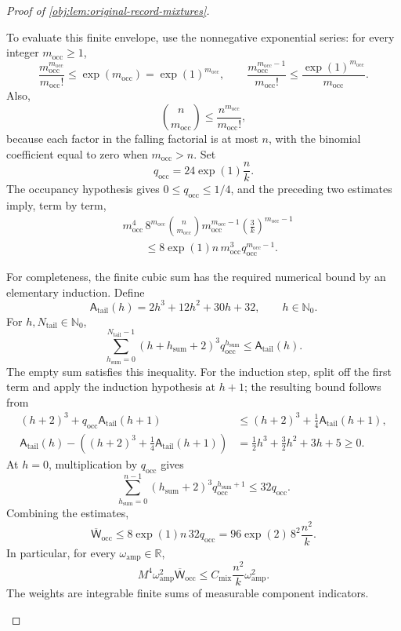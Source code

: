 \begin{proof}[Proof of \cref{obj:lem:original-record-mixtures}]
\begin{enumerate}
To evaluate this finite envelope, use the nonnegative exponential series:
for every integer \(m_{\mathrm{occ}}\ge1\),
\[
\frac{m_{\mathrm{occ}}^{m_{\mathrm{occ}}}}{m_{\mathrm{occ}}!}
\le \exp(m_{\mathrm{occ}})
=\exp(1)^{m_{\mathrm{occ}}},
\qquad
\frac{m_{\mathrm{occ}}^{m_{\mathrm{occ}}-1}}
{m_{\mathrm{occ}}!}
\le\frac{\exp(1)^{m_{\mathrm{occ}}}}{m_{\mathrm{occ}}}.
\]
Also,
\[
\binom n{m_{\mathrm{occ}}}
\le\frac{n^{m_{\mathrm{occ}}}}{m_{\mathrm{occ}}!},
\]
because each factor in the falling factorial is at most \(n\), with
the binomial coefficient equal to zero when \(m_{\mathrm{occ}}>n\).
Set
\[
q_{\mathrm{occ}}=24\exp(1)\frac nk.
\]
The occupancy hypothesis gives \(0\le q_{\mathrm{occ}}\le1/4\), and the
preceding two estimates imply, term by term,
\[
\begin{aligned}
&m_{\mathrm{occ}}^4\,8^{m_{\mathrm{occ}}}
\binom n{m_{\mathrm{occ}}}
m_{\mathrm{occ}}^{m_{\mathrm{occ}}-1}
\left(\frac3k\right)^{m_{\mathrm{occ}}-1}\\
&\hspace{2em}\le
8\exp(1)n\,m_{\mathrm{occ}}^3
q_{\mathrm{occ}}^{m_{\mathrm{occ}}-1}.
\end{aligned}
\]

For completeness, the finite cubic sum has the required numerical bound
by an elementary induction. Define
\[
\mathsf A_{\mathrm{tail}}(h)
=2h^3+12h^2+30h+32,
\qquad h\in\mathbb N_0.
\]
For \(h,N_{\mathrm{tail}}\in\mathbb N_0\),
\[
\sum_{h_{\mathrm{sum}}=0}^{N_{\mathrm{tail}}-1}
(h+h_{\mathrm{sum}}+2)^3q_{\mathrm{occ}}^{h_{\mathrm{sum}}}
\le \mathsf A_{\mathrm{tail}}(h).
\]
The empty sum satisfies this inequality. For the induction step, split
off the first term and apply the induction hypothesis at \(h+1\);
the resulting bound follows from
\[
\begin{aligned}
(h+2)^3+q_{\mathrm{occ}}\mathsf A_{\mathrm{tail}}(h+1)
&\le (h+2)^3+\frac14\mathsf A_{\mathrm{tail}}(h+1),\\
\mathsf A_{\mathrm{tail}}(h)
-\left((h+2)^3+\frac14\mathsf A_{\mathrm{tail}}(h+1)\right)
&=\frac12h^3+\frac32h^2+3h+5\ge0.
\end{aligned}
\]
At \(h=0\), multiplication by \(q_{\mathrm{occ}}\) gives
\[
\sum_{h_{\mathrm{sum}}=0}^{n-1}
(h_{\mathrm{sum}}+2)^3q_{\mathrm{occ}}^{h_{\mathrm{sum}}+1}
\le32q_{\mathrm{occ}}.
\]
Combining the estimates,
\[
\overline{\mathsf W}_{\mathrm{occ}}
\le8\exp(1)n\,32q_{\mathrm{occ}}
=96\exp(2)\,8^2\frac{n^2}{k}.
\]
In particular, for every \(\omega_{\mathrm{amp}}\in\mathbb R\),
\[
M^4\omega_{\mathrm{amp}}^2\overline{\mathsf W}_{\mathrm{occ}}
\le
C_{\mathrm{mix}}\frac{n^2}{k}\omega_{\mathrm{amp}}^2.
\]
The weights are integrable finite sums of measurable component
indicators.


\end{enumerate}
\end{proof}
